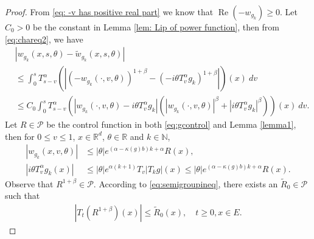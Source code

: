 \documentclass[12pt, a4paper]{amsart}
\theoremstyle{definition}
\numberwithin{equation}{section}
\begin{document}
\begin{proof}
From \eqref{eq: -v has positive real part} we know that $\operatorname{Re}(-w_{g_k})\geq 0$.
    Let $C_0>0$ be the constant in Lemma \ref{lem: Lip of power function}, then from \eqref{eq:chareq2}, we have
\begin{align}
\label{eq: estimate of wgk}
   &|w_{g_k}(x,s,\theta)-\tilde{w}_{g_k}(x,s,\theta)|
   \\&\leq \int_0^s T_{s-v}^{\alpha}\left(|(-w_{g_k}(\cdot,v,\theta))^{1+\beta}-(-i\theta T_v^{\alpha}g_k)^{1+\beta}|\right)(x)~dv
   \\&\leq C_0\int_0^s T_{s-v}^{\alpha}\left( |w_{g_k}(\cdot,v,\theta)-i\theta T_v^{\alpha}g_{k}|\left(|w_{g_k}(\cdot,v,\theta)|^{\beta}+|i\theta T_v^{\alpha}g_k|^{\beta}\right)\right)(x)~dv.
\end{align}
   Let $R\in \mathcal P$ be the control function in both \eqref{eq:gcontrol} and Lemma \ref{lemma1}, then for $0\leq v \leq 1$, $x\in \mathbb{R}^d$, $\theta \in \mathbb{R}$ and $k \in \mathbb N$,
\begin{align}
\label{eq: upper bound of wgk}
    |w_{g_{k}}(x,v,\theta)|
    &\leq |\theta|e^{(\alpha-\kappa(g)b)k+\alpha}R(x),
    \\
    |i\theta T_v^{\alpha}g_k(x)|
    &\leq |\theta| e^{\alpha(k+1)}T_v|T_k g|(x)
    \leq |\theta|e^{(\alpha-\kappa(g)b)k+\alpha}R(x).
\end{align}
    Observe that $R^{1+\beta}\in \mathcal P$. 
    According to \eqref{eq:semigroupineq}, there exists an $\tilde R_0 \in \mathcal P$ such that
\begin{align}
\label{eq: tilde R0}
    |T_t (R^{1+\beta})(x)| 
    \leq \tilde R_0(x),
    \quad t\geq0, x\in E.
\end{align}

\end{proof}
\end{document}
